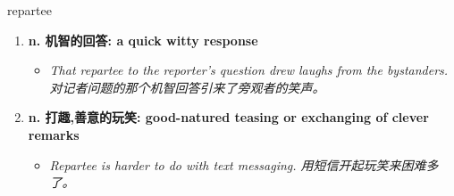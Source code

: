 
\begin{frame}
{\huge repartee}
\begin{center}
\begin{enumerate}\Large
  \item \textbf{n. 机智的回答: a quick witty response}
  \begin{itemize}
    \item \em{\Large{That repartee to the reporter's question drew laughs from the bystanders. 对记者问题的那个机智回答引来了旁观者的笑声。}}
  \end{itemize}
  \item \textbf{n. 打趣,善意的玩笑: good-natured teasing or exchanging of clever remarks}
  \begin{itemize}
    \item \em{\Large{Repartee is harder to do with text messaging. 用短信开起玩笑来困难多了。}}
  \end{itemize}
\end{enumerate}
\end{center}
\end{frame}
